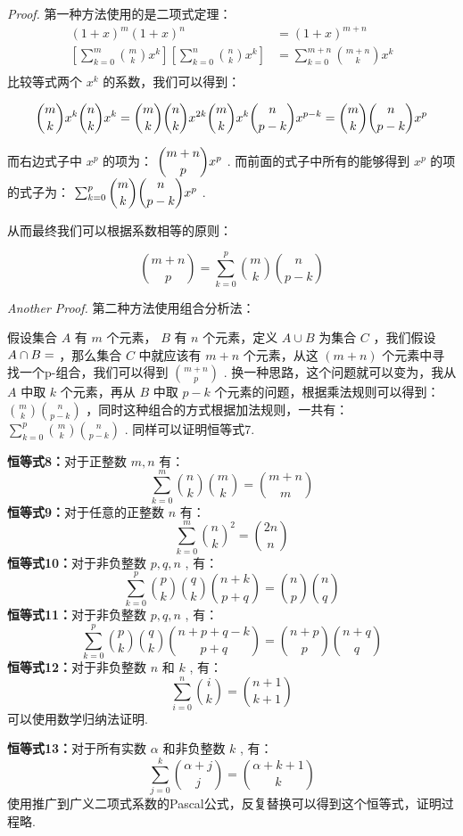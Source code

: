\documentclass[cn, hazy, blue, normal, 12pt]{elegantnote}
\begin{document}
\textit{Proof.} 第一种方法使用的是二项式定理：
$$
    \begin{split}
        (1+x)^m(1+x)^n&=(1+x)^{m+n}\\
        \left[\sum_{k=0}^m\binom{m}{k}x^k\right]\left[\sum_{k=0}^n\binom{n}{k}x^k\right]&=\sum_{k=0}^{m+n}\binom{m+n}{k}x^k\\
    \end{split}
$$
比较等式两个 $ x^k $ 的系数，我们可以得到：

$$
    \binom{m}{k}x^k \binom{n}{k}x^k=\binom{m}{k}\binom{n}{k}x^{2k}\\
    \binom{m}{k}x^k \binom{n}{p-k}x^{p-k}=\binom{m}{k}\binom{n}{p-k}x^p
$$

而右边式子中 $ x^p $ 的项为： $ \dbinom{m+n}{p}x^p $ . 而前面的式子中所有的能够得到 $ x^p $ 的项的式子为： $ \sum_{k=0}^p\dbinom{m}{k}\dbinom{n}{p-k}x^p $ .

从而最终我们可以根据系数相等的原则：

$$
    \binom{m+n}{p}=\sum_{k=0}^p\binom{m}{k}\binom{n}{p-k}
$$

\textit{Another Proof.} 第二种方法使用组合分析法：

假设集合 $ A $ 有 $ m $ 个元素， $ B $ 有 $ n $ 个元素，定义 $ A\cup B $ 为集合 $ C $ ，我们假设 $ A\cap B=\empty $ ，那么集合 $ C $ 中就应该有 $ m+n $ 个元素，从这 $ (m+n) $ 个元素中寻找一个p-组合，我们可以得到 $ \binom{m+n}{p} $ . 换一种思路，这个问题就可以变为，我从 $ A $ 中取 $ k $ 个元素，再从 $ B $ 中取 $ p-k $ 个元素的问题，根据乘法规则可以得到： $ \binom{m}{k}\binom{n}{p-k} $ ，同时这种组合的方式根据加法规则，一共有： $ \sum_{k=0}^p\binom{m}{k}\binom{n}{p-k} $ . 同样可以证明恒等式7.

\textbf{恒等式8：}对于正整数 $ m,n $ 有：
$$
    \sum_{k=0}^m\binom{n}{k}\binom{m}{k}=\binom{m+n}{m}
$$
\textbf{恒等式9：}对于任意的正整数 $ n $ 有：
$$
    \sum_{k=0}^m\binom{n}{k}^2=\binom{2n}{n}
$$
\textbf{恒等式10：}对于非负整数 $ p,q,n $ , 有：
$$
    \sum_{k=0}^p\binom{p}{k}\binom{q}{k}\binom{n+k}{p+q}=\binom{n}{p}\binom{n}{q}
$$
\textbf{恒等式11：}对于非负整数 $ p,q,n $ , 有：
$$
    \sum_{k=0}^p\binom{p}{k}\binom{q}{k}\binom{n+p+q-k}{p+q}=\binom{n+p}{p}\binom{n+q}{q}
$$
\textbf{恒等式12：}对于非负整数 $ n $ 和 $ k $ , 有：
$$
    \sum_{i=0}^n\binom{i}{k}=\binom{n+1}{k+1}
$$
可以使用数学归纳法证明.

\textbf{恒等式13：}对于所有实数 $ \alpha $ 和非负整数 $ k $ , 有：
$$
    \sum_{j=0}^k\binom{\alpha+j}{j}=\binom{\alpha+k+1}{k}
$$
使用推广到广义二项式系数的Pascal公式，反复替换可以得到这个恒等式，证明过程略.
\end{document}

